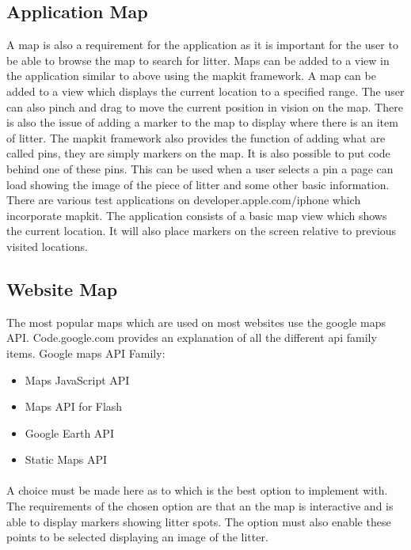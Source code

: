 \documentclass[12pt]{article}
\begin{document}

\subsection{Application Map}

A map is also a requirement for the application as it is important for the user to be able to browse the map to search for litter.
Maps can be added to a view in the application similar to above using the \gls{mapkit} framework. A map can be added to a view which displays the current location to a specified range. The user can also pinch and drag to move the current position in vision on the map. There is also the issue of adding a marker to the map to display where there is an item of litter. The \gls{mapkit} framework also provides the function of adding what are called pins, they are simply markers on the map. It is also possible to put code behind one of these pins. This can be used when a user selects a pin a page can load showing the image of the piece of litter and some other basic information.
There are various test applications on developer.apple.com/iphone which incorporate \gls{mapkit}. The application consists of a basic map view which shows the current location. It will also place markers on the screen relative to previous visited locations.


\subsection{Website Map}

The most popular maps which are used on most websites use the google maps API. Code.google.com provides an explanation of all the different \gls{api} family items. 
Google maps API Family:
\begin{itemize} 
\item{} Maps JavaScript API
\item{} Maps API for Flash
\item{} Google Earth API
\item{} Static Maps API
\end{itemize}

\paragraph{}
\label{par:First Paragraph}

A choice must be made here as to which is the best option to implement with. The requirements of the chosen option are that an the map is interactive and is able to display markers showing litter spots. The option must also enable these points to be selected displaying an image of the litter.
\end{document}
